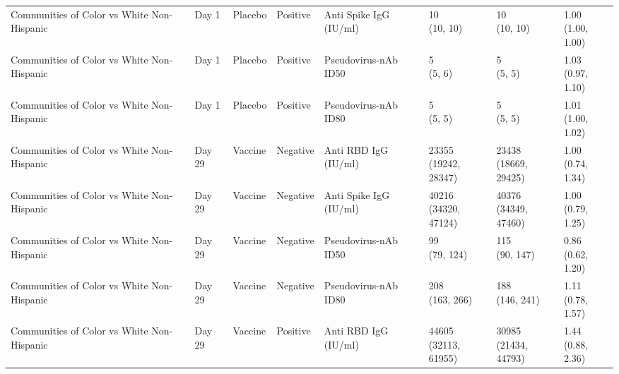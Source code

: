 \documentclass[]{book}
\theoremstyle{definition}
\theoremstyle{definition}
\theoremstyle{definition}
\newcommand{\1}{\mathbbm{1}}
\begin{document}
\begin{landscape}
\begin{ThreePartTable}
\begin{longtable}[t]{>{\raggedright\arraybackslash}p{2.7cm}lllllll}
Communities of Color vs White Non-Hispanic & Day 1 & Placebo & Positive & Anti Spike IgG (IU/ml) & \makecell[l]{10\\(10, 10)} & \makecell[l]{10\\(10, 10)} & \makecell[l]{1.00\\(1.00, 1.00)}\\
Communities of Color vs White Non-Hispanic & Day 1 & Placebo & Positive & Pseudovirus-nAb ID50 & \makecell[l]{5\\(5, 6)} & \makecell[l]{5\\(5, 5)} & \makecell[l]{1.03\\(0.97, 1.10)}\\
Communities of Color vs White Non-Hispanic & Day 1 & Placebo & Positive & Pseudovirus-nAb ID80 & \makecell[l]{5\\(5, 5)} & \makecell[l]{5\\(5, 5)} & \makecell[l]{1.01\\(1.00, 1.02)}\\
Communities of Color vs White Non-Hispanic & Day 29 & Vaccine & Negative & Anti RBD IgG (IU/ml) & \makecell[l]{23355\\(19242, 28347)} & \makecell[l]{23438\\(18669, 29425)} & \makecell[l]{1.00\\(0.74, 1.34)}\\
\addlinespace
Communities of Color vs White Non-Hispanic & Day 29 & Vaccine & Negative & Anti Spike IgG (IU/ml) & \makecell[l]{40216\\(34320, 47124)} & \makecell[l]{40376\\(34349, 47460)} & \makecell[l]{1.00\\(0.79, 1.25)}\\
Communities of Color vs White Non-Hispanic & Day 29 & Vaccine & Negative & Pseudovirus-nAb ID50 & \makecell[l]{99\\(79, 124)} & \makecell[l]{115\\(90, 147)} & \makecell[l]{0.86\\(0.62, 1.20)}\\
Communities of Color vs White Non-Hispanic & Day 29 & Vaccine & Negative & Pseudovirus-nAb ID80 & \makecell[l]{208\\(163, 266)} & \makecell[l]{188\\(146, 241)} & \makecell[l]{1.11\\(0.78, 1.57)}\\
Communities of Color vs White Non-Hispanic & Day 29 & Vaccine & Positive & Anti RBD IgG (IU/ml) & \makecell[l]{44605\\(32113, 61955)} & \makecell[l]{30985\\(21434, 44793)} & \makecell[l]{1.44\\(0.88, 2.36)}\\

\end{longtable}
\end{ThreePartTable}
\end{landscape}
\end{document}
